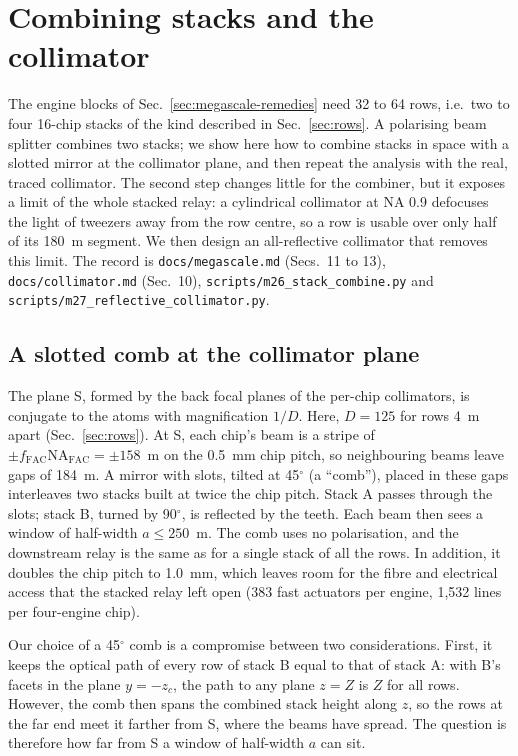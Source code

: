 \section{Combining stacks and the collimator}\label{sec:combine}

The engine blocks of Sec.~\ref{sec:megascale-remedies} need 32 to 64 rows, i.e.\ two to four 16-chip stacks of the kind described in Sec.~\ref{sec:rows}. A polarising beam splitter combines two stacks; we show here how to combine stacks in space with a slotted mirror at the collimator plane, and then repeat the analysis with the real, traced collimator. The second step changes little for the combiner, but it exposes a limit of the whole stacked relay: a cylindrical collimator at NA 0.9 defocuses the light of tweezers away from the row centre, so a row is usable over only half of its 180~\textmu m segment. We then design an all-reflective collimator that removes this limit. The record is \texttt{docs/\allowbreak megascale.md} (Secs.~11 to 13), \texttt{docs/\allowbreak collimator.md} (Sec.~10), \texttt{scripts/m26\_stack\_combine.py} and \texttt{scripts/m27\_reflective\_collimator.py}.

\subsection{A slotted comb at the collimator plane}\label{sec:combine-comb}

The plane S, formed by the back focal planes of the per-chip collimators, is conjugate to the atoms with magnification $1/D$. Here, $D=125$ for rows 4~\textmu m apart (Sec.~\ref{sec:rows}). At S, each chip's beam is a stripe of $\pm f_\mathrm{FAC}\mathrm{NA}_\mathrm{FAC}=\pm158$~\textmu m on the 0.5~mm chip pitch, so neighbouring beams leave gaps of 184~\textmu m. A mirror with slots, tilted at 45$^\circ$ (a ``comb''), placed in these gaps interleaves two stacks built at twice the chip pitch. Stack A passes through the slots; stack B, turned by 90$^\circ$, is reflected by the teeth. Each beam then sees a window of half-width $a\leq250$~\textmu m. The comb uses no polarisation, and the downstream relay is the same as for a single stack of all the rows. In addition, it doubles the chip pitch to 1.0~mm, which leaves room for the fibre and electrical access that the stacked relay left open (383 fast actuators per engine, 1,532 lines per four-engine chip).

Our choice of a 45$^\circ$ comb is a compromise between two considerations. First, it keeps the optical path of every row of stack B equal to that of stack A: with B's facets in the plane $y=-z_c$, the path to any plane $z=Z$ is $Z$ for all rows. However, the comb then spans the combined stack height along $z$, so the rows at the far end meet it farther from S, where the beams have spread. The question is therefore how far from S a window of half-width $a$ can sit.

